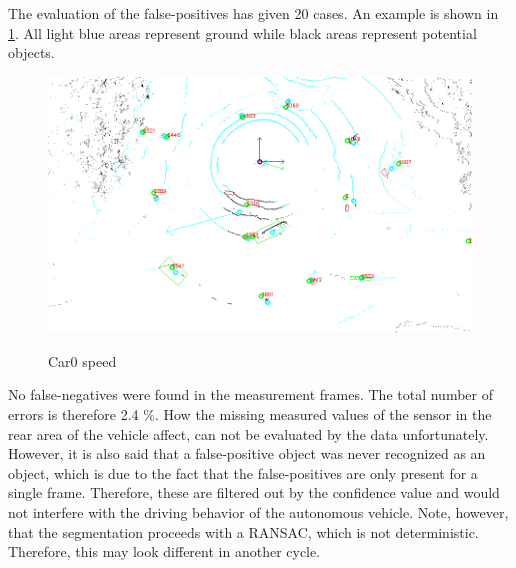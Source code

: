 \documentclass[11pt,oneside,openright]{mpreport}
\begin{document}
The evaluation of the false-positives has given 20 cases. An example is shown in \cref{false_pos_seg_1}. 
All light blue areas represent ground while black areas represent potential objects.

\begin{figure}[!htb]
  \caption{Car0 speed} 
  \centering
  \includegraphics[width=\textwidth]{bilder/false_pos1.png}
 \label{false_pos_seg_1}
\end{figure}


No false-negatives were found in the measurement frames. The total number of errors is therefore 2.4 \%.
How the missing measured values of the sensor in the rear area of the vehicle affect, can not be evaluated by the data unfortunately.
However, it is also said that a false-positive object was never recognized as an object,
which is due to the fact that the false-positives are only present for a single frame.
Therefore, these are filtered out by the confidence value and would not interfere with the driving behavior of the autonomous vehicle.
Note, however, that the segmentation proceeds with a \ac{RANSAC}, which is not deterministic. Therefore, this may look different in another cycle.
\end{document}
